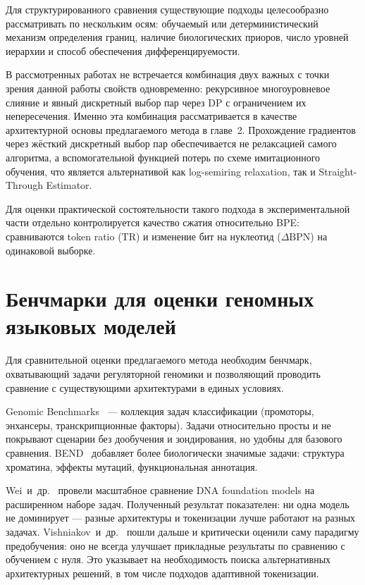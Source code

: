 Для структурированного сравнения существующие подходы
целесообразно рассматривать по нескольким осям: обучаемый или детерминистический
механизм определения границ, наличие биологических приоров, число
уровней иерархии и способ обеспечения дифференцируемости.

В рассмотренных работах не встречается комбинация двух важных с
точки зрения данной работы свойств одновременно: рекурсивное
многоуровневое слияние и явный дискретный выбор пар через DP с
ограничением их непересечения. Именно эта комбинация рассматривается
в качестве архитектурной основы предлагаемого метода в главе~2.
Прохождение градиентов через жёсткий дискретный выбор пар обеспечивается
не релаксацией самого алгоритма, а вспомогательной функцией потерь по
схеме имитационного обучения, что является альтернативой как
log-semiring relaxation, так и Straight-Through Estimator.

Для оценки практической состоятельности такого подхода в
экспериментальной части отдельно контролируется качество сжатия
относительно BPE: сравниваются token ratio ($\mathrm{TR}$) и изменение
бит на нуклеотид ($\Delta\mathrm{BPN}$) на одинаковой выборке.

\section{Бенчмарки для оценки геномных языковых моделей}

Для сравнительной оценки предлагаемого метода необходим бенчмарк,
охватывающий задачи регуляторной геномики и позволяющий проводить
сравнение с существующими архитектурами в единых условиях.

Genomic Benchmarks~\cite{gresovaGenomicBenchmarksCollection2023} ---
коллекция задач классификации (промоторы, энхансеры, транскрипционные
факторы). Задачи относительно просты и не покрывают сценарии без
дообучения и зондирования, но удобны для базового сравнения.
BEND~\cite{tangBENDBenchmarkDNA2024} добавляет более биологически
значимые задачи: структура хроматина, эффекты мутаций, функциональная аннотация.

Wei~и~др.~\cite{weiGenomicBenchmarksDNA2025} провели масштабное
сравнение DNA foundation models на расширенном наборе задач.
Полученный результат показателен: ни одна модель не доминирует --- разные
архитектуры и токенизации лучше работают на разных задачах.
Vishniakov~и~др.~\cite{vishniakovGenomicFoundationlessModels2024}
пошли дальше и критически оценили саму парадигму предобучения: оно не
всегда улучшает прикладные результаты по сравнению с обучением с
нуля. Это указывает на необходимость поиска альтернативных
архитектурных решений, в том числе подходов адаптивной токенизации.

